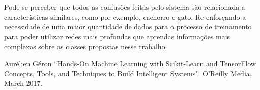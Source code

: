 \documentclass[conference]{IEEEtran}
\begin{document}
Pode-se perceber que todos as confusões feitas pelo sistema são relacionada a características similares, como por exemplo, cachorro e gato. Re-enforçando a necessidade de uma maior quantidade de dados para o processo de treinamento para poder utilizar redes mais profundas que aprendas informações mais complexas sobre as classes propostas nesse trabalho.

\begin{thebibliography}{00}
 Aurélien Géron ``Hands-On Machine Learning with Scikit-Learn and TensorFlow
Concepts, Tools, and Techniques to Build Intelligent Systems". O'Reilly Media, March 2017.
\end{thebibliography}
\end{document}
